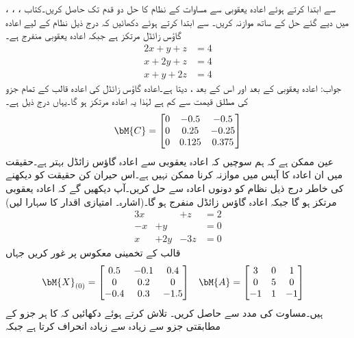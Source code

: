 \quad
{}، ، ،  سے ابتدا کرتے ہوئے اعادہ یعقوبی سے مساوات  کے نظام  کا حل دو قدم تک حاصل کریں۔کتاب میں دیے گئے حل کے ساتھ موازنہ کریں۔
\quad
{} سے ابتدا کرتے ہوئے دکھائیں کہ درج ذیل نظام کے لیے اعادہ گاؤس زائڈل مرتکز ہے جبکہ اعادہ یعقوبی منفرج ہے۔
\begin{align*}
2x+y+z&=4\\
x+2y+z&=4\\
x+y+2z&=4
\end{align*}
جواب:\quad
اعادہ یعقوبی  کے بعد  اور اس کے بعد ،  دیتا ہے۔اعادہ گاؤس زائڈل کی اعادہ قالب  کے تمام جزو کی مطلق قیمت  سے کم ہے لہٰذا یہ اعادہ مرتکز ہو گا۔یہاں  درج ذیل ہے۔
\begin{align*}
\bM{C}=
\begin{bmatrix}
0&-0.5&-0.5\\
0&0.25&-0.25\\
0&0.125&0.375
\end{bmatrix}
\end{align*}
\quad
عین ممکن ہے کہ ہم سوچیں کہ اعادہ یعقوبی سے  اعادہ گاؤس زائڈل بہتر ہے۔حقیقت میں ان اعادہ کا آپس میں موازنہ کرنا ممکن نہیں ہے۔اس حیران کن حقیقت کو دیکھنے کی خاطر درج ذیل نظام کو دونوں اعادہ سے حل کریں۔آپ دیکھیں گے کہ اعادہ یعقوبی مرتکز ہو گا جبکہ اعادہ گاؤس زائڈل منفرج ہو گا۔(اشارہ۔ امتیازی اقدار کا سہارا لیں)
\begin{alignat*}{3}
x&{}&+z&=2\\
-x&+y&{}&=0\\
x&+2y&-3z&=0
\end{alignat*}  
\quad
قالب  کے  تخمینی معکوس  پر غور کریں جہاں
\begin{align*}
\bM{X}_{(0)}&=\begin{bmatrix} 0.5&-0.1&0.4\\0&0.2&0\\-0.4&0.3&-1.5 \end{bmatrix} & \bM{A}&=
\begin{bmatrix}
3&0&1\\0&5&0\\-1&1&-1
\end{bmatrix}
\end{align*}
ہیں۔مساوت  کی مدد سے  حاصل کریں۔ تلاش کرتے ہوئے دکھائیں کہ  کا ہر جزو  کے مطابقتی جزو سے زیادہ سے زیادہ  انحراف کرتا ہے جبکہ
